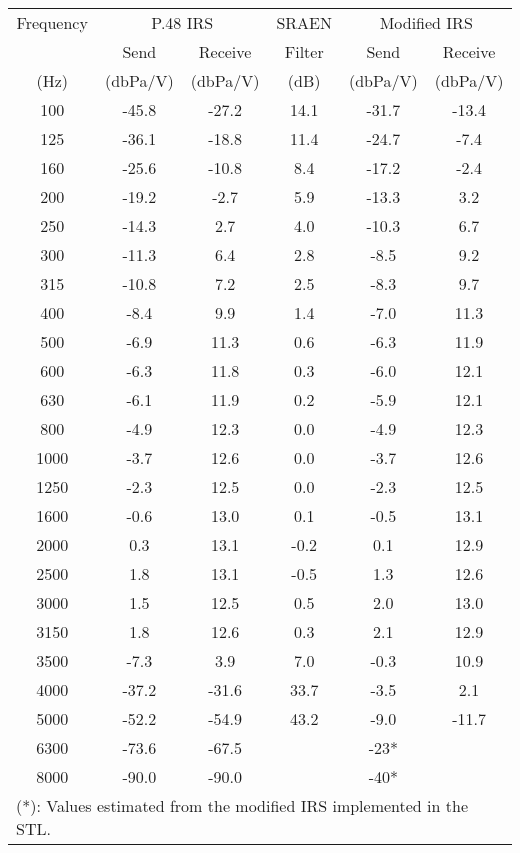 \begin{table}
\begin{center}
\begin{tabular}{|c|c|c|c|c|c|}
\hline Frequency &\multicolumn{2}{|c|}{P.48 IRS}
        &SRAEN
        &\multicolumn{2}{|c|}{Modified IRS} \\
        & Send & Receive &Filter &Send & Receive \\
(Hz) & (dbPa/V) &(dbPa/V) &(dB) &(dbPa/V) &(dbPa/V) \\
\hline \hline
100     &-45.8  &-27.2  &14.1   &-31.7  &-13.4  \\
125     &-36.1  &-18.8  &11.4   &-24.7  & -7.4  \\
160     &-25.6  &-10.8  & 8.4   &-17.2  & -2.4  \\
200     &-19.2  & -2.7  & 5.9   &-13.3  &  3.2  \\
250     &-14.3  &  2.7  & 4.0   &-10.3  &  6.7  \\
300     &-11.3  &  6.4  & 2.8   & -8.5  &  9.2  \\
315     &-10.8  &  7.2  & 2.5   & -8.3  &  9.7  \\
400     & -8.4  &  9.9  & 1.4   & -7.0  & 11.3  \\
500     & -6.9  & 11.3  & 0.6   & -6.3  & 11.9  \\
600     & -6.3  & 11.8  & 0.3   & -6.0  & 12.1  \\
630     & -6.1  & 11.9  & 0.2   & -5.9  & 12.1  \\
800     & -4.9  & 12.3  & 0.0   & -4.9  & 12.3  \\
1000    & -3.7  & 12.6  & 0.0   & -3.7  & 12.6  \\
1250    & -2.3  & 12.5  & 0.0   & -2.3  & 12.5  \\
1600    & -0.6  & 13.0  & 0.1   & -0.5  & 13.1  \\
2000    &  0.3  & 13.1  &-0.2   &  0.1  & 12.9  \\
2500    &  1.8  & 13.1  &-0.5   &  1.3  & 12.6  \\
3000    &  1.5  & 12.5  & 0.5   &  2.0  & 13.0  \\
3150    &  1.8  & 12.6  & 0.3   &  2.1  & 12.9  \\
3500    & -7.3  &  3.9  & 7.0   & -0.3  & 10.9  \\
4000    &-37.2  &-31.6  &33.7   & -3.5  &  2.1  \\
5000    &-52.2  &-54.9  &43.2   & -9.0  &-11.7  \\
6300    &-73.6  &-67.5  &       & -23* &  \\
8000    &-90.0  &-90.0  &       & -40* &  \\
\hline \multicolumn{6}{|l|}{(*): Values estimated from the modified
IRS
                     implemented in the STL.}\\
\hline
\end{tabular}
\end{center}
\end{table}

